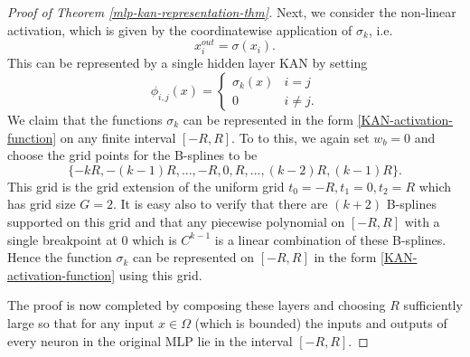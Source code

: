 \documentclass[12pt]{caltech_thesis}
\numberwithin{equation}{section}
\begin{document}
\begin{proof}[Proof of Theorem \ref{mlp-kan-representation-thm}]
Next, we consider the non-linear activation, which is given by the coordinatewise application of $\sigma_k$, i.e.
\begin{equation}
    x_i^{out} = \sigma(x_i).
\end{equation}
This can be represented by a single hidden layer KAN by setting
\begin{equation}
    \phi_{i,j}(x) = \begin{cases}
        \sigma_k(x) & i=j\\
        0 & i \neq j.
    \end{cases}
\end{equation}
We claim that the functions $\sigma_k$ can be represented in the form \eqref{KAN-activation-function} on any finite interval $[-R,R]$. To to this, we again set $w_b = 0$ and choose the grid points for the B-splines to be
$$\{-kR, -(k-1)R,...,-R,0,R,...,(k-2)R, (k-1)R\}.$$
This grid is the grid extension of the uniform grid $t_0 = -R, t_1 = 0, t_2 = R$ which has grid size $G = 2$. It is easy also to verify that there are $(k+2)$ B-splines supported on this grid and that any piecewise polynomial on $[-R,R]$ with a single breakpoint at $0$ which is $C^{k-1}$ is a linear combination of these B-splines. Hence the function $\sigma_k$ can be represented on $[-R,R]$ in the form \eqref{KAN-activation-function} using this grid.

The proof is now completed by composing these layers and choosing $R$ sufficiently large so that for any input $x\in \Omega$ (which is bounded) the inputs and outputs of every neuron in the original MLP lie in the interval $[-R,R]$.
\end{proof}
\end{document}
